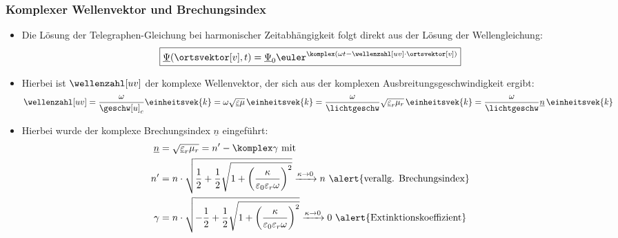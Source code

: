 \begin{frame}
  \frametitle{Komplexer Wellenvektor und Brechungsindex}
  \begin{itemize}[<+->]
  \item Die Lösung der Telegraphen-Gleichung bei harmonischer Zeitabhängigkeit folgt direkt aus der Lösung der Wellengleichung:
    \begin{equation*}
      \boxed{\underline{\Psi}(\ortsvektor[v], t) = \underline{\Psi}_0 \euler^{\komplex(\omega t - \wellenzahl[uv]\cdot\ortsvektor[v])}} 
    \end{equation*}
  \item Hierbei ist \(\wellenzahl[uv]\) der \alert{komplexe Wellenvektor}, der sich aus der komplexen Ausbreitungsgeschwindigkeit ergibt:
    \begin{equation*}
      \wellenzahl[uv] = \frac{\omega}{\geschw[u]_c} \einheitsvek{k} = \omega \sqrt{\underline{\varepsilon}\mu}\, \einheitsvek{k}= \frac{\omega}{\lichtgeschw} \sqrt{\underline{\varepsilon}_r\mu_r}\, \einheitsvek{k} = \frac{\omega}{\lichtgeschw} \underline{n}\, \einheitsvek{k}
    \end{equation*}
  \item Hierbei wurde der \alert{komplexe Brechungsindex} \(\underline{n}\) eingeführt:
    \begin{align*}
      \underline{n} &= \sqrt{\underline{\varepsilon}_r\mu_r} = n^{\prime} - \komplex \gamma \text{ mit}\\
       n^{\prime} &= n\cdot \sqrt{ \frac{1}{2}+\frac{1}{2}\sqrt{1+ \left( \frac{\kappa}{\varepsilon_0\varepsilon_r\omega} \right)^2} } \xrightarrow{\kappa\to 0} n \text{ \alert{verallg. Brechungsindex}}\\                 
      \gamma &= n \cdot \sqrt{-\frac{1}{2}+\frac{1}{2}\sqrt{1+ \left( \frac{\kappa}{\varepsilon_0\varepsilon_r\omega} \right)^2} } \xrightarrow{\kappa\to 0} 0  \text{ \alert{Extinktionskoeffizient}}               
      \end{align*}
    \end{itemize}
  \end{frame}

